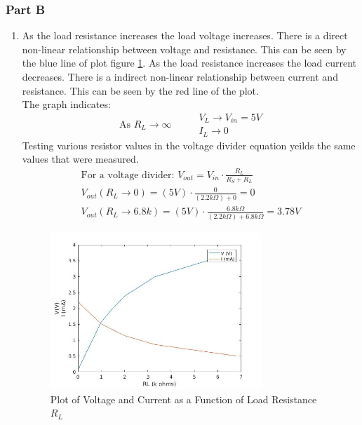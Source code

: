 \documentclass{article}
\begin{document}
\subsubsection{Part B}
\begin{enumerate}
  \item As the load resistance increases the load voltage increases.
  There is a direct non-linear relationship between voltage and resistance. This can be seen by the blue line of plot
  figure \ref{fig:currentvoltage}. As the load resistance increases the load current decreases.
  There is a indirect non-linear relationship between current and resistance. This can be seen by the red line of the plot.\\
  The graph indicates:
  \begin{equation}
    \text{ As } R_L \to \infty \hspace{1cm} \begin{matrix}
    V_L \to V_{in} = 5 V \\
    I_L \to 0
  \end{matrix}
  \end{equation}
  Testing various resistor values in the voltage divider equation yeilds the same
  values that were measured.
  \begin{gather}
    \text{For a voltage divider: } V_{out} = V_{in} \cdot \frac{R_L}{R_S+R_L} \\
    V_{out}(R_L \to 0) = (5 V) \cdot \frac{0}{(2.2 k \Omega)+0} = 0 \\
    V_{out}(R_L \to 6.8k ) = (5 V) \cdot \frac{6.8 k \Omega}{(2.2 k \Omega)+ 6.8 k \Omega} = 3.78V
  \end{gather}



    \begin{figure}[!ht]
  \centering
  \caption{Plot of Voltage and Current as a Function of Load Resistance $R_L$\label{fig:currentvoltage}}
  \includegraphics[width=0.75\textwidth]{img/plotc.jpg}
  \end{figure}



\end{enumerate}
\end{document}
